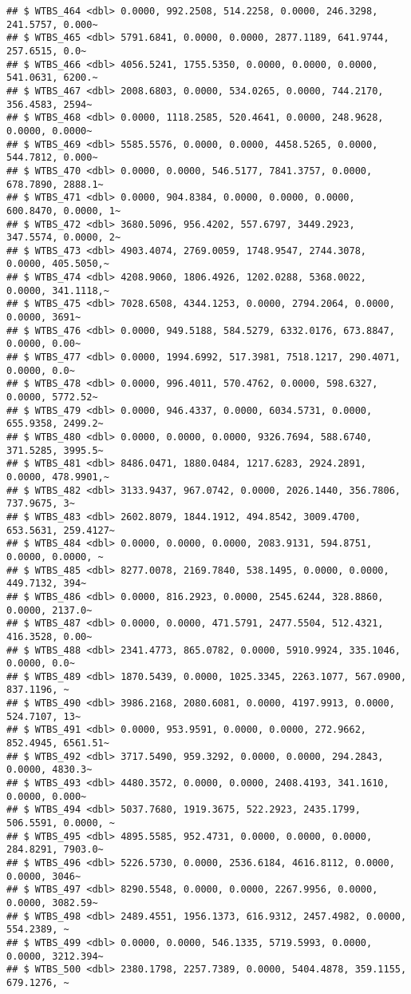 \documentclass[
]{article}
\begin{document}
\begin{verbatim}
## $ WTBS_464 <dbl> 0.0000, 992.2508, 514.2258, 0.0000, 246.3298, 241.5757, 0.000~
## $ WTBS_465 <dbl> 5791.6841, 0.0000, 0.0000, 2877.1189, 641.9744, 257.6515, 0.0~
## $ WTBS_466 <dbl> 4056.5241, 1755.5350, 0.0000, 0.0000, 0.0000, 541.0631, 6200.~
## $ WTBS_467 <dbl> 2008.6803, 0.0000, 534.0265, 0.0000, 744.2170, 356.4583, 2594~
## $ WTBS_468 <dbl> 0.0000, 1118.2585, 520.4641, 0.0000, 248.9628, 0.0000, 0.0000~
## $ WTBS_469 <dbl> 5585.5576, 0.0000, 0.0000, 4458.5265, 0.0000, 544.7812, 0.000~
## $ WTBS_470 <dbl> 0.0000, 0.0000, 546.5177, 7841.3757, 0.0000, 678.7890, 2888.1~
## $ WTBS_471 <dbl> 0.0000, 904.8384, 0.0000, 0.0000, 0.0000, 600.8470, 0.0000, 1~
## $ WTBS_472 <dbl> 3680.5096, 956.4202, 557.6797, 3449.2923, 347.5574, 0.0000, 2~
## $ WTBS_473 <dbl> 4903.4074, 2769.0059, 1748.9547, 2744.3078, 0.0000, 405.5050,~
## $ WTBS_474 <dbl> 4208.9060, 1806.4926, 1202.0288, 5368.0022, 0.0000, 341.1118,~
## $ WTBS_475 <dbl> 7028.6508, 4344.1253, 0.0000, 2794.2064, 0.0000, 0.0000, 3691~
## $ WTBS_476 <dbl> 0.0000, 949.5188, 584.5279, 6332.0176, 673.8847, 0.0000, 0.00~
## $ WTBS_477 <dbl> 0.0000, 1994.6992, 517.3981, 7518.1217, 290.4071, 0.0000, 0.0~
## $ WTBS_478 <dbl> 0.0000, 996.4011, 570.4762, 0.0000, 598.6327, 0.0000, 5772.52~
## $ WTBS_479 <dbl> 0.0000, 946.4337, 0.0000, 6034.5731, 0.0000, 655.9358, 2499.2~
## $ WTBS_480 <dbl> 0.0000, 0.0000, 0.0000, 9326.7694, 588.6740, 371.5285, 3995.5~
## $ WTBS_481 <dbl> 8486.0471, 1880.0484, 1217.6283, 2924.2891, 0.0000, 478.9901,~
## $ WTBS_482 <dbl> 3133.9437, 967.0742, 0.0000, 2026.1440, 356.7806, 737.9675, 3~
## $ WTBS_483 <dbl> 2602.8079, 1844.1912, 494.8542, 3009.4700, 653.5631, 259.4127~
## $ WTBS_484 <dbl> 0.0000, 0.0000, 0.0000, 2083.9131, 594.8751, 0.0000, 0.0000, ~
## $ WTBS_485 <dbl> 8277.0078, 2169.7840, 538.1495, 0.0000, 0.0000, 449.7132, 394~
## $ WTBS_486 <dbl> 0.0000, 816.2923, 0.0000, 2545.6244, 328.8860, 0.0000, 2137.0~
## $ WTBS_487 <dbl> 0.0000, 0.0000, 471.5791, 2477.5504, 512.4321, 416.3528, 0.00~
## $ WTBS_488 <dbl> 2341.4773, 865.0782, 0.0000, 5910.9924, 335.1046, 0.0000, 0.0~
## $ WTBS_489 <dbl> 1870.5439, 0.0000, 1025.3345, 2263.1077, 567.0900, 837.1196, ~
## $ WTBS_490 <dbl> 3986.2168, 2080.6081, 0.0000, 4197.9913, 0.0000, 524.7107, 13~
## $ WTBS_491 <dbl> 0.0000, 953.9591, 0.0000, 0.0000, 272.9662, 852.4945, 6561.51~
## $ WTBS_492 <dbl> 3717.5490, 959.3292, 0.0000, 0.0000, 294.2843, 0.0000, 4830.3~
## $ WTBS_493 <dbl> 4480.3572, 0.0000, 0.0000, 2408.4193, 341.1610, 0.0000, 0.000~
## $ WTBS_494 <dbl> 5037.7680, 1919.3675, 522.2923, 2435.1799, 506.5591, 0.0000, ~
## $ WTBS_495 <dbl> 4895.5585, 952.4731, 0.0000, 0.0000, 0.0000, 284.8291, 7903.0~
## $ WTBS_496 <dbl> 5226.5730, 0.0000, 2536.6184, 4616.8112, 0.0000, 0.0000, 3046~
## $ WTBS_497 <dbl> 8290.5548, 0.0000, 0.0000, 2267.9956, 0.0000, 0.0000, 3082.59~
## $ WTBS_498 <dbl> 2489.4551, 1956.1373, 616.9312, 2457.4982, 0.0000, 554.2389, ~
## $ WTBS_499 <dbl> 0.0000, 0.0000, 546.1335, 5719.5993, 0.0000, 0.0000, 3212.394~
## $ WTBS_500 <dbl> 2380.1798, 2257.7389, 0.0000, 5404.4878, 359.1155, 679.1276, ~
\end{verbatim}
\end{document}

